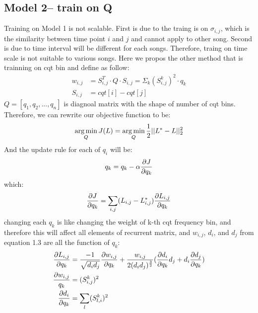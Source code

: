 \documentclass[final]{siamltexmm}
\DeclareMathOperator*{\argmin}{arg\,min} %
\begin{document}
\subsection{Model 2-- train on Q}
Training on Model 1 is not scalable. First is due to the traing is on $\sigma_{i,j}$, which is the similarity between time point $i$ and $j$ and cannot apply to other song. Second is due to time interval will be different for each songs. Therefore, traing on time scale is not suitable to various songs. Here we propos the other method that is trainning on cqt bin and define as follow:
\begin{equation}
\begin{aligned}
w_{i,j} &= S^T_{i,j} \cdot Q \cdot S_{i,j} = \Sigma_k (S^k_{i,j})^2 \cdot q_{k}\\
S_{i,j} &= cqt[i] - cqt[j]
\end{aligned}
\end{equation}
$Q = [q_1, q_2, ..., q_n]$ is diagnoal matrix with the shape of number of cqt bins. Therefore, we can rewrite our objective function to be:
\begin{equation}
\begin{aligned}
\argmin_Q J(L) = \argmin_Q {1\over 2}||L^{\ast} - L||^2_2
\end{aligned}
\end{equation}
And the update rule for each of $q_i$ will be:
\begin{equation}
\begin{aligned}
q_k = q_k - \alpha {\partial J \over \partial q_k}
\end{aligned}
\end{equation}
which:
\begin{equation}
\begin{aligned}
{\partial J \over \partial q_k} = \sum_{\substack{i,j}} (L_{i,j} - L_{i,j}^{\ast}) {\partial L_{i,j} \over \partial q_k}
\end{aligned}
\end{equation}
changing each $q_k$ is like changing the weight of k-th cqt frequency bin, and therefore this will affect all elements of recurrent matrix, and $w_{i,j}$, $d_i$, and $d_j$ from equation 1.3 are all the function of $q_k$:
\begin{equation}
\begin{aligned}
{\partial L_{i,j} \over \partial q_k} &= {-1 \over \sqrt{d_id_j}} {\partial w_{i,j}\over \partial q_k} + {w_{i,j} \over 2(d_id_j)^{3\over2}}({\partial d_i\over \partial q_k}d_j + d_i{\partial d_j\over \partial q_k})\\
{\partial w_{i,j} \over q_k} &= (S_{i,j}^k)^2 \\
{\partial d_i \over \partial q_k} &= \sum_{\substack{l}} (S_{l,i}^k)^2
\end{aligned}
\end{equation}
\end{document}
